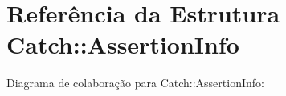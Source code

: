 \hypertarget{structCatch_1_1AssertionInfo}{}\section{Referência da Estrutura Catch\+:\+:Assertion\+Info}
\label{structCatch_1_1AssertionInfo}


Diagrama de colaboração para Catch\+:\+:Assertion\+Info\+:
